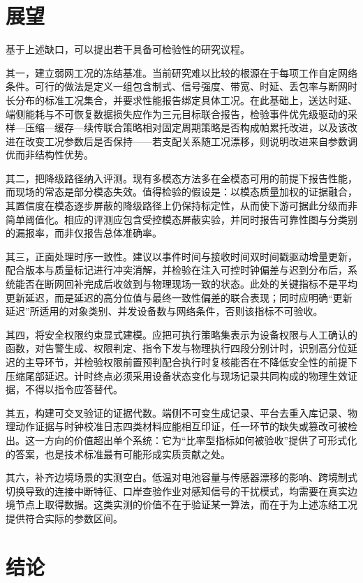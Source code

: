 \documentclass[11pt,a4paper]{article}
\begin{document}
\section{展望}

基于上述缺口，可以提出若干具备可检验性的研究议程。

其一，建立弱网工况的冻结基准。当前研究难以比较的根源在于每项工作自定网络条件。可行的做法是定义一组包含制式、信号强度、带宽、时延、丢包率与断网时长分布的标准工况集合，并要求性能报告绑定具体工况。在此基础上，送达时延、端侧能耗与不可恢复数据损失应作为三元目标联合报告，检验事件优先级驱动的采样—压缩—缓存—续传联合策略相对固定周期策略是否构成帕累托改进，以及该改进在改变工况参数后是否保持——若支配关系随工况漂移，则说明改进来自参数调优而非结构性优势。

其二，把降级路径纳入评测。现有多模态方法多在全模态可用的前提下报告性能，而现场的常态是部分模态失效。值得检验的假设是：以模态质量加权的证据融合，其置信度在模态逐步屏蔽的降级路径上仍保持标定性，从而使下游可据此分级而非简单阈值化。相应的评测应包含受控模态屏蔽实验，并同时报告可靠性图与分类别的漏报率，而非仅报告总体准确率。

其三，正面处理时序一致性。建议以事件时间与接收时间双时间戳驱动增量更新，配合版本与质量标记进行冲突消解，并检验在注入可控时钟偏差与迟到分布后，系统能否在断网回补完成后收敛到与物理现场一致的状态。此处的关键指标不是平均更新延迟，而是延迟的高分位值与最终一致性偏差的联合表现；同时应明确“更新延迟”所适用的对象类别、并发设备数与网络条件，否则该指标不可验收。

其四，将安全权限约束显式建模。应把可执行策略集表示为设备权限与人工确认的函数，对告警生成、权限判定、指令下发与物理执行四段分别计时，识别高分位延迟的主导环节，并检验权限前置预判配合执行时复核能否在不降低安全性的前提下压缩尾部延迟。计时终点必须采用设备状态变化与现场记录共同构成的物理生效证据，不得以指令应答替代。

其五，构建可交叉验证的证据代数。端侧不可变生成记录、平台去重入库记录、物理动作证据与时钟校准日志四类材料应能相互印证，任一环节的缺失或篡改可被检出。这一方向的价值超出单个系统：它为“比率型指标如何被验收”提供了可形式化的答案，也是技术标准最有可能形成实质贡献之处。

其六，补齐边境场景的实测空白。低温对电池容量与传感器漂移的影响、跨境制式切换导致的连接中断特征、口岸查验作业对感知信号的干扰模式，均需要在真实边境节点上取得数据。这类实测的价值不在于验证某一算法，而在于为上述冻结工况提供符合实际的参数区间。

\section{结论}
\end{document}
